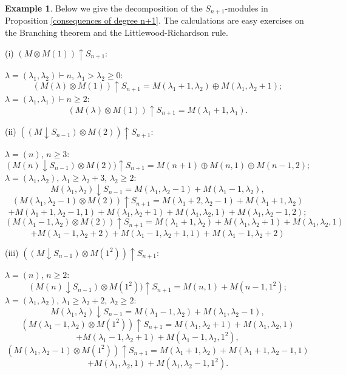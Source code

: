 \documentclass{amsart}
\theoremstyle{definition}
\newtheorem{example}[theorem]{Example}
\begin{document}
\begin{example}\label{consequences in partitions}
Below we give the decomposition of the $S_{n+1}$-modules in Proposition \ref{consequences of degree n+1}.
The calculations are easy exercises on the Branching theorem and the Littlewood-Richardson rule.

(i) $(M\otimes M(1))\uparrow S_{n+1}$:

\noindent $\lambda=(\lambda_1,\lambda_2)\vdash n$, $\lambda_1>\lambda_2\geq 0$:
\[
(M(\lambda)\otimes M(1))\uparrow S_{n+1}=M(\lambda_1+1,\lambda_2)\oplus M(\lambda_1,\lambda_2+1);
\]
$\lambda=(\lambda_1,\lambda_1)\vdash n\geq 2$:
\[
(M(\lambda)\otimes M(1))\uparrow S_{n+1}=M(\lambda_1+1,\lambda_1).
\]

(ii) $((M\downarrow S_{n-1})\otimes M(2))\uparrow S_{n+1}$:

\noindent $\lambda=(n)$, $n\geq 3$:
\[
(M(n)\downarrow S_{n-1})\otimes M(2))\uparrow S_{n+1}=M(n+1)\oplus M(n,1)\oplus M(n-1,2);
\]
$\lambda=(\lambda_1,\lambda_2)$, $\lambda_1\geq \lambda_2+3$, $\lambda_2\geq 2$:
\[
M(\lambda_1,\lambda_2)\downarrow S_{n-1}=M(\lambda_1,\lambda_2-1)+M(\lambda_1-1,\lambda_2),
\]
\[
(M(\lambda_1,\lambda_2-1)\otimes M(2))\uparrow S_{n+1}=M(\lambda_1+2,\lambda_2-1)+M(\lambda_1+1,\lambda_2)
\]
\[
+M(\lambda_1+1,\lambda_2-1,1)+M(\lambda_1,\lambda_2+1)+M(\lambda_1,\lambda_2,1)+M(\lambda_1,\lambda_2-1,2);
\]
\[
(M(\lambda_1-1,\lambda_2)\otimes M(2))\uparrow S_{n+1}=M(\lambda_1+1,\lambda_2)+M(\lambda_1,\lambda_2+1)+M(\lambda_1,\lambda_2,1)
\]
\[
+M(\lambda_1-1,\lambda_2+2)+M(\lambda_1-1,\lambda_2+1,1)+M(\lambda_1-1,\lambda_2+2)
\]

(iii) $((M\downarrow S_{n-1})\otimes M(1^2))\uparrow S_{n+1}$:

\noindent $\lambda=(n)$, $n\geq 2$:
\[
(M(n)\downarrow S_{n-1})\otimes M(1^2))\uparrow S_{n+1}=M(n,1)+M(n-1,1^2);
\]
$\lambda=(\lambda_1,\lambda_2)$, $\lambda_1\geq \lambda_2+2$, $\lambda_2\geq 2$:
\[
M(\lambda_1,\lambda_2)\downarrow S_{n-1}=M(\lambda_1-1,\lambda_2)+M(\lambda_1,\lambda_2-1),
\]
\[
(M(\lambda_1-1,\lambda_2)\otimes M(1^2))\uparrow S_{n+1}=M(\lambda_1,\lambda_2+1)+M(\lambda_1,\lambda_2,1)
\]
\[
+M(\lambda_1-1,\lambda_2+1)+M(\lambda_1-1,\lambda_2,1^2),
\]
\[
(M(\lambda_1,\lambda_2-1)\otimes M(1^2))\uparrow S_{n+1}=M(\lambda_1+1,\lambda_2)+M(\lambda_1+1,\lambda_2-1,1)
\]
\[
+M(\lambda_1,\lambda_2,1)+M(\lambda_1,\lambda_2-1,1^2).
\]
\end{example}
\end{document}
